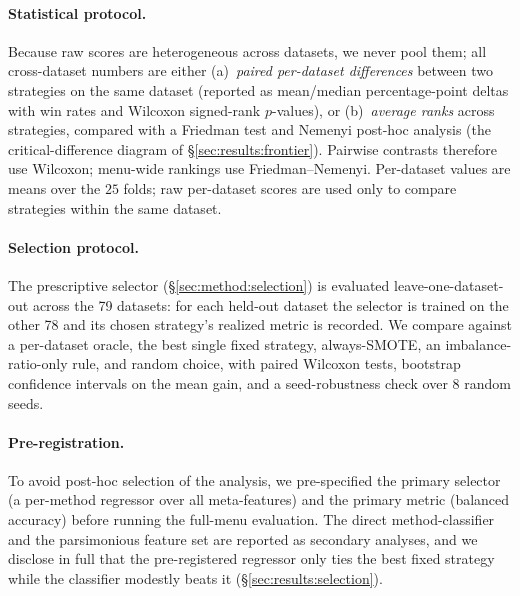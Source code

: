 \paragraph{Statistical protocol.} Because raw scores are heterogeneous across
datasets, we never pool them; all cross-dataset numbers are either
(a)~\emph{paired per-dataset differences} between two strategies on the same
dataset (reported as mean/median percentage-point deltas with win rates and
Wilcoxon signed-rank \cite{wilcoxon1945individual} $p$-values), or
(b)~\emph{average ranks} across strategies, compared with a Friedman test and
Nemenyi post-hoc analysis \cite{demsar2006statistical} (the critical-difference
diagram of \S\ref{sec:results:frontier}). Pairwise contrasts therefore use
Wilcoxon; menu-wide rankings use Friedman--Nemenyi. Per-dataset values are means
over the $25$ folds; raw per-dataset scores are used only to compare strategies
within the same dataset.

\paragraph{Selection protocol.} The prescriptive selector
(\S\ref{sec:method:selection}) is evaluated leave-one-dataset-out across the
79 datasets: for each held-out dataset the selector is trained on the other 78 and
its chosen strategy's realized metric is recorded. We compare against a per-dataset
oracle, the best single fixed strategy, always-SMOTE, an imbalance-ratio-only rule,
and random choice, with paired Wilcoxon tests, bootstrap confidence intervals on
the mean gain, and a seed-robustness check over 8 random seeds.

\paragraph{Pre-registration.} To avoid post-hoc selection of the analysis, we
pre-specified the primary selector (a per-method regressor over all meta-features)
and the primary metric (balanced accuracy) before running the full-menu
evaluation. The direct method-classifier and the parsimonious feature set are
reported as secondary analyses, and we disclose in full that the pre-registered
regressor only ties the best fixed strategy while the classifier modestly beats it
(\S\ref{sec:results:selection}).
